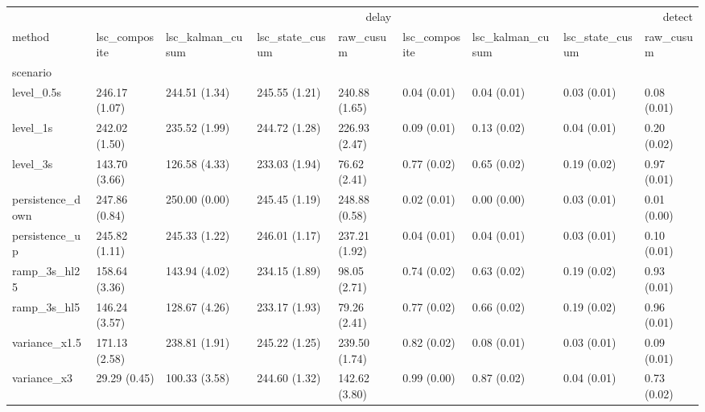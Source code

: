 \begin{tabular}{lllllllll}
\toprule
 & \multicolumn{4}{r}{delay} & \multicolumn{4}{r}{detect} \\
method & lsc_composite & lsc_kalman_cusum & lsc_state_cusum & raw_cusum & lsc_composite & lsc_kalman_cusum & lsc_state_cusum & raw_cusum \\
scenario &  &  &  &  &  &  &  &  \\
\midrule
level_0.5s & 246.17 (1.07) & 244.51 (1.34) & 245.55 (1.21) & 240.88 (1.65) & 0.04 (0.01) & 0.04 (0.01) & 0.03 (0.01) & 0.08 (0.01) \\
level_1s & 242.02 (1.50) & 235.52 (1.99) & 244.72 (1.28) & 226.93 (2.47) & 0.09 (0.01) & 0.13 (0.02) & 0.04 (0.01) & 0.20 (0.02) \\
level_3s & 143.70 (3.66) & 126.58 (4.33) & 233.03 (1.94) & 76.62 (2.41) & 0.77 (0.02) & 0.65 (0.02) & 0.19 (0.02) & 0.97 (0.01) \\
persistence_down & 247.86 (0.84) & 250.00 (0.00) & 245.45 (1.19) & 248.88 (0.58) & 0.02 (0.01) & 0.00 (0.00) & 0.03 (0.01) & 0.01 (0.00) \\
persistence_up & 245.82 (1.11) & 245.33 (1.22) & 246.01 (1.17) & 237.21 (1.92) & 0.04 (0.01) & 0.04 (0.01) & 0.03 (0.01) & 0.10 (0.01) \\
ramp_3s_hl25 & 158.64 (3.36) & 143.94 (4.02) & 234.15 (1.89) & 98.05 (2.71) & 0.74 (0.02) & 0.63 (0.02) & 0.19 (0.02) & 0.93 (0.01) \\
ramp_3s_hl5 & 146.24 (3.57) & 128.67 (4.26) & 233.17 (1.93) & 79.26 (2.41) & 0.77 (0.02) & 0.66 (0.02) & 0.19 (0.02) & 0.96 (0.01) \\
variance_x1.5 & 171.13 (2.58) & 238.81 (1.91) & 245.22 (1.25) & 239.50 (1.74) & 0.82 (0.02) & 0.08 (0.01) & 0.03 (0.01) & 0.09 (0.01) \\
variance_x3 & 29.29 (0.45) & 100.33 (3.58) & 244.60 (1.32) & 142.62 (3.80) & 0.99 (0.00) & 0.87 (0.02) & 0.04 (0.01) & 0.73 (0.02) \\
\bottomrule
\end{tabular}

